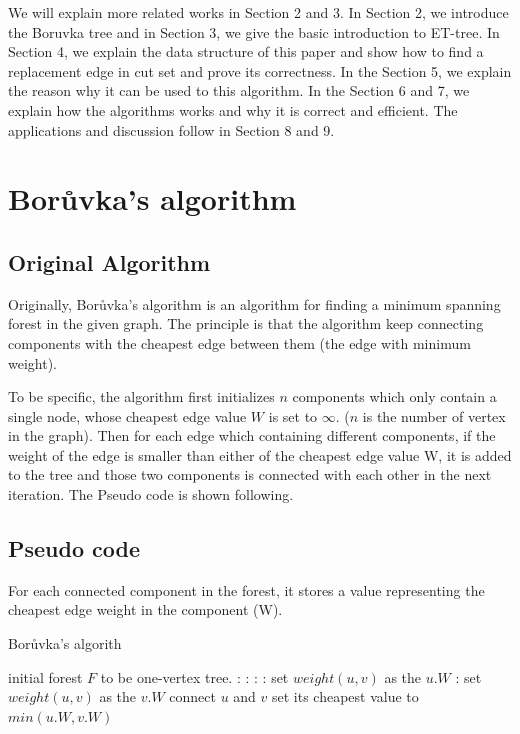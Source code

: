 \documentclass[conference,compsoc]{IEEEtran}
\begin{document}
We will explain more related works in Section 2 and 3. In Section 2, we introduce the Boruvka tree and in Section 3, we give the basic introduction to ET-tree. In Section 4, we explain the data structure of this paper and show how to find a replacement edge in cut set and prove its correctness. In the Section 5, we explain the reason why it can be used to this algorithm. In the Section 6 and 7, we explain how the algorithms works and why it is correct and efficient. The applications and discussion follow in Section 8 and 9.

\section{Borůvka's algorithm}
\subsection{Original Algorithm}
Originally, Borůvka's algorithm is an algorithm for finding a minimum spanning forest in the given graph. The principle is that the algorithm keep connecting components with the cheapest edge between them (the edge with minimum weight).
\par
To be specific, the algorithm first initializes $n$ components which only contain a single node, whose cheapest edge value $W$ is set to $\infty$. ($n$ is the number of vertex in the graph). Then for each edge which containing different components, if the weight of the edge is smaller than either of the cheapest edge value W, it is added to the tree and those two components is connected with each other in the next iteration. 
The Pseudo code is shown following.

\subsection{Pseudo code}
For each connected component in the forest, it stores a value representing the cheapest edge weight in the component (W).
\begin{algorithm}[H]
\caption{Borůvka's algorith}
\begin{algorithmic}[1]
\State initial forest $F$ to be one-vertex tree.
:
	:
		:
			:
				\State set $weight(u,v)$ as the $u.W$
			\EndIf
			:
				\State set $weight(u,v)$ as the $v.W$
			\EndIf
		\EndIf
	\EndFor
		\State connect $u$ and $v$
		\State set its cheapest value to $min(u.W,v.W)$
	\EndFor
\EndWhile
\end{algorithmic}
\end{algorithm}
\end{document}
